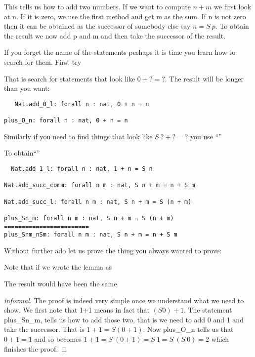 This tells us how to add two numbers. If we want to compute $n+m$ we first look at n. If it is zero, we use the first method and get m as the sum.  If n is not zero then it can be obtained as  the successor of somebody else say $n = S \ p$. To obtain the result we now add p and m and then take the successor of the result.

If you forget the name of the statements perhaps it is time you learn how to search for them. First try
  
  
  That is search for statements that look like $0 + ? = ?$.  The result will be longer than you want:
   
   \begin{verbatim}
   Nat.add_0_l: forall n : nat, 0 + n = n

plus_O_n: forall n : nat, 0 + n = n
\end{verbatim}
 Similarly if you need to find things that look like $S \ ? + ? =?$ you use ``''
 
 To obtain``''
  
  \begin{verbatim}
  Nat.add_1_l: forall n : nat, 1 + n = S n

Nat.add_succ_comm: forall n m : nat, S n + m = n + S m

Nat.add_succ_l: forall n m : nat, S n + m = S (n + m)

plus_Sn_m: forall n m : nat, S n + m = S (n + m)
========================
plus_Snm_nSm: forall n m : nat, S n + m = n + S m
  \end{verbatim}
  
  
  
  
  Without further ado let us prove the thing you always wanted to prove:


Note that if we wrote the lemma as


The result would have been the same. 

\begin{proof}[informal]The proof is indeed very simple once we understand what we need to show. We first note that 1+1 means in fact that $(S 0) + 1$. The statement  plus\_Sn\_m, tells us how to add those two, that is we need to add 0 and 1 and take the successor. That is $1+1=S (0+1)$. Now  plus\_O\_n tells us that $0+1=1$ and so becomes $1+1= S\ (0+1) =S\ 1= S \ (S \ 0) =2$ which finishes the proof.\end{proof}

